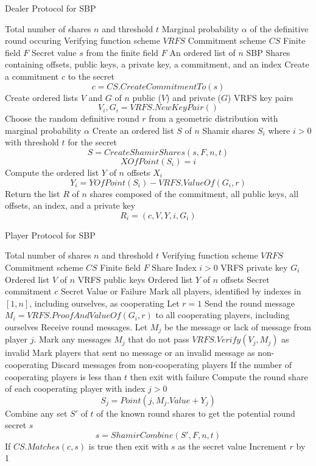 \documentclass{dalcsthesis}
\begin{document}
\begin{algorithm}
  \caption{Dealer Protocol for SBP}
  \label{alg:SBP:Dealer}
  \begin{algorithmic}[1]
    \INPUT Total number of shares $n$ and threshold $t$
    \INPUT Marginal probability $\alpha$ of the definitive round occuring
    \INPUT Verifying function scheme $VRFS$
    \INPUT Commitment scheme $CS$
    \INPUT Finite field $F$
    \INPUT Secret value $s$ from the finite field $F$
    \OUTPUT An ordered list of $n$ SBP Shares containing offsets, public keys, a private key, a commitment, and an index
    \STATE Create a commitment $c$ to the secret
    	$$c = CS.CreateCommitmentTo(s)$$
    \STATE Create ordered lists $V$ and $G$ of $n$ public ($V$) and private ($G$) VRFS key pairs
    	$$V_i, G_i = VRFS.NewKeyPair()$$
    \STATE Choose the random definitive round $r$ from a geometric distribution with marginal probability $\alpha$
    \STATE Create an ordered list $S$ of $n$ Shamir shares $S_i$ where $i > 0$ with threshold $t$ for the secret
    	$$S = CreateShamirShares(s, F, n, t)$$
    	$$XOfPoint(S_i) = i$$
    \STATE Compute the ordered list $Y$ of $n$ offsets $X_i$
    	$$Y_i = YOfPoint(S_i) - VRFS.ValueOf(G_i, r)$$
    \STATE Return the list $R$ of $n$ shares composed of the commitment, all public keys, all offsets, an index, and a private key
    	$$R_i = (c, V, Y, i, G_i)$$
  \end{algorithmic}
\end{algorithm}

\begin{algorithm}
  \caption{Player Protocol for SBP}
  \label{alg:SBP:Player}
  \begin{algorithmic}[1]
    \INPUT Total number of shares $n$ and threshold $t$
    \INPUT Verifying function scheme $VRFS$
    \INPUT Commitment scheme $CS$
    \INPUT Finite field $F$
    \INPUT Share Index $i > 0$
    \INPUT VRFS private key $G_i$
    \INPUT Ordered list $V$ of $n$ VRFS public keys
    \INPUT Ordered list $Y$ of $n$ offsets
    \INPUT Secret commitment $c$
    \OUTPUT Secret Value or Failure
    \STATE Mark all players, identified by indexes in $[1, n]$, including ourselves, as cooperating
    \STATE Let $r = 1$
      \STATE Send the round message $M_i = VRFS.ProofAndValueOf(G_i, r)$ to all cooperating players, including ourselves
      \STATE Receive round messages. Let $M_j$ be the message or lack of message from player $j$.
      \STATE Mark any messages $M_j$ that do not pass $VRFS.Verify(V_j, M_j)$ as invalid
      \STATE Mark players that sent no message or an invalid message as non-cooperating
      \STATE Discard messages from non-cooperating players
      \STATE If the number of cooperating players is less than $t$ then exit with failure
      \STATE Compute the round share of each cooperating player with index $j > 0$
			$$S_j = Point(j, M_j.Value + Y_j)$$
      \STATE Combine any set $S'$ of $t$ of the known round shares to get the potential round secret $s$
      		$$s = ShamirCombine(S', F, n, t)$$
      \STATE If $CS.Matches(c, s)$ is true then exit with $s$ as the secret value
      \STATE Increment $r$ by 1
    \ENDWHILE
  \end{algorithmic}
\end{algorithm}
\end{document}
